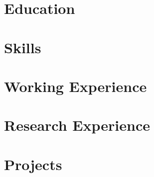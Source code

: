 \documentclass{resume}
\begin{document}

\newcommand{\equalcontrib}{$^{\dagger}$}




\section{Education}





\section{Skills}




\section{Working Experience}





\section{Research Experience}




\section{Projects}




\end{document}
